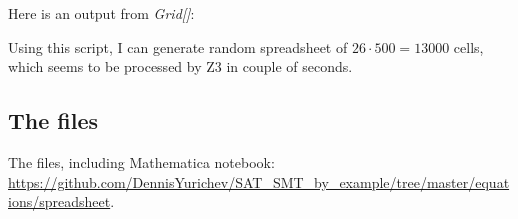 

Here is an output from \emph{Grid[]}:



Using this script, I can generate random spreadsheet of $26 \cdot 500=13000$ cells,
which seems to be processed by Z3 in couple of seconds.

\subsection{The files}

The files, including Mathematica notebook: \url{https://github.com/DennisYurichev/SAT_SMT_by_example/tree/master/equations/spreadsheet}.

